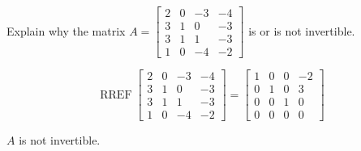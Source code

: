 
\begin{exerciseStatement}


Explain why the matrix \(A= \left[\begin{array}{cccc}
2 & 0 & -3 & -4 \\
3 & 1 & 0 & -3 \\
3 & 1 & 1 & -3 \\
1 & 0 & -4 & -2
\end{array}\right] \) is or is not invertible.


\end{exerciseStatement}
    
\begin{exerciseAnswer} 


\[\operatorname{RREF} \left[\begin{array}{cccc}
2 & 0 & -3 & -4 \\
3 & 1 & 0 & -3 \\
3 & 1 & 1 & -3 \\
1 & 0 & -4 & -2
\end{array}\right] = \left[\begin{array}{cccc}
1 & 0 & 0 & -2 \\
0 & 1 & 0 & 3 \\
0 & 0 & 1 & 0 \\
0 & 0 & 0 & 0
\end{array}\right] \]

\(A\) is not invertible.
\end{exerciseAnswer}
    
